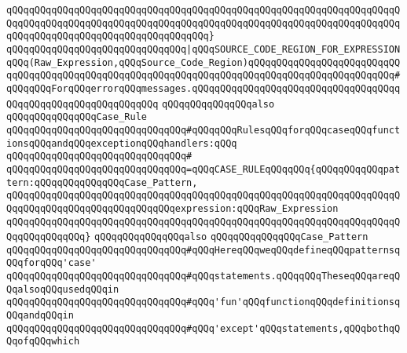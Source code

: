 \verb|qQQqqQQqqQQqqQQqqQQqqQQqqQQqqQQqqQQqqQQqqQQqqQQqqQQqqQQqqQQqqQQqqQQqqQQqqQQqqQQqqQQqqQQqqQQqqQQqqQQqqQQqqQQqqQQqqQQqqQQqqQQqqQQqqQQqqQQqqQQqqQQqqQQqqQQqqQQqqQQqqQQqqQQqqQQqqQQq}|\newline
\verb|qQQqqQQqqQQqqQQqqQQqqQQqqQQqqQQq|\verb#|qQQqSOURCE_CODE_REGION_FOR_EXPRESSIONqQQq(Raw_Expression,qQQqSource_Code_Region)qQQqqQQqqQQqqQQqqQQqqQQqqQQqqQQqqQQqqQQqqQQqqQQqqQQqqQQqqQQqqQQqqQQqqQQqqQQqqQQqqQQqqQQqqQQqqQQq#\verb|#qQQqqQQqForqQQqerrorqQQqmessages.qQQqqQQqqQQqqQQqqQQqqQQqqQQqqQQqqQQqqQQqqQQqqQQqqQQqqQQqqQQqqQQq|\newline
\newline
\newline
\newline
\verb|qQQqqQQqqQQqqQQqalso|\newline
\verb|qQQqqQQqqQQqqQQqCase_Rule|\newline
\newline
\verb|qQQqqQQqqQQqqQQqqQQqqQQqqQQqqQQq#qQQqqQQqRulesqQQqforqQQqcaseqQQqfunctionsqQQqandqQQqexceptionqQQqhandlers:qQQq|\newline
\verb|qQQqqQQqqQQqqQQqqQQqqQQqqQQqqQQq#|\newline
\verb|qQQqqQQqqQQqqQQqqQQqqQQqqQQqqQQq=qQQqCASE_RULEqQQqqQQq{qQQqqQQqqQQqpattern:qQQqqQQqqQQqqQQqCase_Pattern,|\newline
\verb|qQQqqQQqqQQqqQQqqQQqqQQqqQQqqQQqqQQqqQQqqQQqqQQqqQQqqQQqqQQqqQQqqQQqqQQqqQQqqQQqqQQqqQQqqQQqqQQqqQQqexpression:qQQqRaw_Expression|\newline
\verb|qQQqqQQqqQQqqQQqqQQqqQQqqQQqqQQqqQQqqQQqqQQqqQQqqQQqqQQqqQQqqQQqqQQqqQQqqQQqqQQqqQQq}|\newline
\newline
\newline
\newline
\verb|qQQqqQQqqQQqqQQqalso|\newline
\verb|qQQqqQQqqQQqqQQqCase_Pattern|\newline
\newline
\verb|qQQqqQQqqQQqqQQqqQQqqQQqqQQqqQQq#qQQqHereqQQqweqQQqdefineqQQqpatternsqQQqforqQQq'case'|\newline
\verb|qQQqqQQqqQQqqQQqqQQqqQQqqQQqqQQq#qQQqstatements.qQQqqQQqTheseqQQqareqQQqalsoqQQqusedqQQqin|\newline
\verb|qQQqqQQqqQQqqQQqqQQqqQQqqQQqqQQq#qQQq'fun'qQQqfunctionqQQqdefinitionsqQQqandqQQqin|\newline
\verb|qQQqqQQqqQQqqQQqqQQqqQQqqQQqqQQq#qQQq'except'qQQqstatements,qQQqbothqQQqofqQQqwhich|\newline
